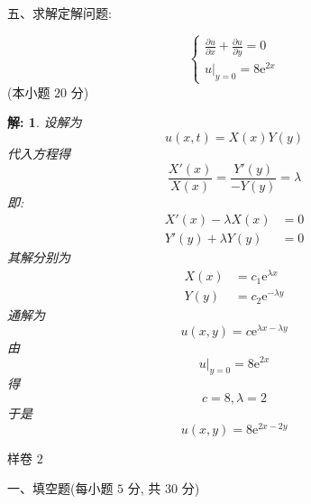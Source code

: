 \documentclass{article}
\theoremstyle{nonumberplain}
\newtheorem{solution}{\textcolor{gr}{解:}}
\newcommand{\ee}{\mathrm{e}}
\begin{document}
    \begin{flushleft}
    	五、求解定解问题:
    \end{flushleft}
    \begin{equation*}
    \begin{cases}
    \frac{\partial u}{\partial x}+\frac{\partial u}{\partial y}=0\\
    u|_{y=0}=8\ee^{2x}
    \end{cases}
    \end{equation*}(本小题 $20$ 分)
    \begin{solution}
    	设解为
    	\begin{equation*}
    		u(x,t)=X(x)Y(y)\tag*{$\cdots\cdots2$分}
    	\end{equation*}
    	代入方程得
    	\begin{equation*}
    		\frac{X'(x)}{X(x)}=\frac{Y'(y)}{-Y(y)}=\lambda\tag*{$\cdots\cdots2$分}
    	\end{equation*}
    	即:
    	\begin{align*}
    		X'(x)-\lambda X(x)&=0\\
    		Y'(y)+\lambda Y(y)&=0\tag*{$\cdots\cdots4$分}
    	\end{align*}
    	其解分别为
    	\begin{align*}
    		X(x)&=c_1\ee^{\lambda x}\\
    		Y(y)&=c_2\ee^{-\lambda y}\tag*{$\cdots\cdots2$分}
    	\end{align*}
    	通解为
    	\begin{equation*}
    		u(x,y)=c\ee^{\lambda x-\lambda y}\tag*{$\cdots\cdots2$分}
    	\end{equation*}
    	由
    	\begin{equation*}
    		u|_{y=0}=8\ee^{2x}\tag*{$\cdots\cdots2$分}
    	\end{equation*}
    	得
    	\begin{equation*}
    		c=8,\lambda=2\tag*{$\cdots\cdots2$分}
    	\end{equation*}
    	于是
    	\begin{equation*}
    		u(x,y)=8\ee^{2x-2y}\tag*{$\cdots\cdots4$分}
    	\end{equation*}
    \end{solution}
    \newpage
    \begin{center}
    	 样卷 $2$
    \end{center}
    \begin{flushleft}
    	一、填空题(每小题 $5$ 分, 共 $30$ 分)
    \end{flushleft}
\end{document}

